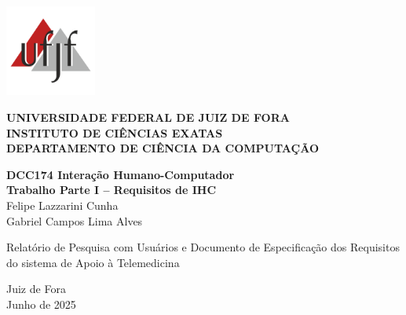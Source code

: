 \documentclass[12pt, a4paper, oneside]{abntex2}
\begin{document}
\begin{folhaderosto}
    \centering
    \vspace*{2cm}
    \begin{minipage}{0.2\textwidth}
        \includegraphics[width=3cm]{Imagens/ufjf-logo.png}
    \end{minipage}
    \hfill
    \begin{minipage}{0.7\textwidth}
        \raggedright
        \textbf{UNIVERSIDADE FEDERAL DE JUIZ DE FORA} \\
        \textbf{INSTITUTO DE CIÊNCIAS EXATAS} \\
        \textbf{DEPARTAMENTO DE CIÊNCIA DA COMPUTAÇÃO}
    \end{minipage}
    \vspace*{3cm}
    \textbf{\Large DCC174 Interação Humano-Computador} \\
    \vspace{0.5cm}
    \textbf{\Large Trabalho Parte I – Requisitos de IHC} \\
    \vspace*{3cm}
    Felipe Lazzarini Cunha \\
    Gabriel Campos Lima Alves \\
    \vspace*{3cm}
    \hfill %
    \begin{minipage}{0.6\textwidth} %
        \raggedright %
        Relatório de Pesquisa com Usuários e Documento de Especificação dos Requisitos do sistema de Apoio à Telemedicina
    \end{minipage}
    \vfill
    \vspace*{1cm}
    \begin{center}
    Juiz de Fora\\
    Junho de 2025
    \end{center}
\end{folhaderosto}

\tableofcontents
\cleardoublepage
\end{document}
